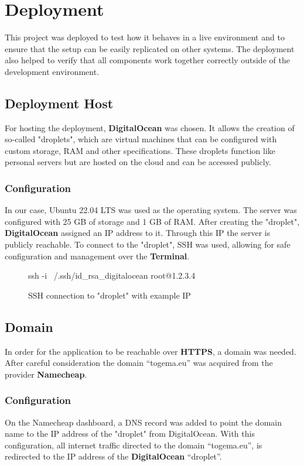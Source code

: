 \documentclass[a4paper,12pt]{report}
\begin{document}
\section{Deployment}
This project was deployed to test how it behaves in a live environment and to ensure that the setup can be easily replicated on other systems. The deployment also helped to verify that all components work together correctly outside of the development environment.
\subsection{Deployment Host}
For hosting the deployment, \textbf{DigitalOcean} was chosen. It allows the creation of so-called "droplets", which are virtual machines that can be configured with custom storage, RAM and other specifications. These droplets function like personal servers but are hosted on the cloud and can be accessed publicly.
\subsubsection{Configuration}
In our case, Ubuntu 22.04 LTS was used as the operating system. The server was configured with 25 GB of storage and 1 GB of RAM. After creating the "droplet", \textbf{DigitalOcean} assigned an IP address to it. Through this IP the server is publicly reachable. To connect to the "droplet", SSH was used, allowing for safe configuration and management over the \textbf{Terminal}.
\begin{figure}[H]
	\begin{terminal}
		ssh -i ~/.ssh/id_rsa_digitalocean root@1.2.3.4
	\end{terminal}
	\caption{SSH connection to "droplet" with example IP}
\end{figure}
\subsection{Domain}
In order for the application to be reachable over \textbf{HTTPS}, a domain was needed. After careful consideration the domain “togema.eu” was acquired from the provider \textbf{Namecheap}.
\subsubsection{Configuration}
On the Namecheap dashboard, a DNS record was added to point the domain name to the IP address of the "droplet" from DigitalOcean. With this configuration, all internet traffic directed to the domain “togema.eu”, is redirected to the IP address of the \textbf{DigitalOcean} “droplet”.
\end{document}
